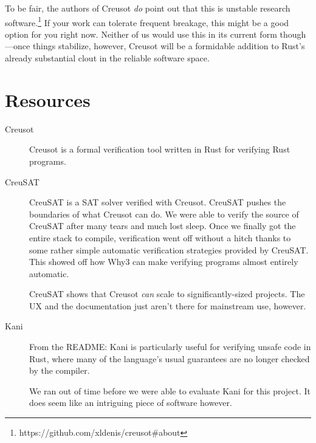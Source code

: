 \documentclass[12pt]{article}
\begin{document}
To be fair, the authors of Creusot \emph{do} point out that this is unstable research software.\footnote{https://github.com/xldenis/creusot#about}
If your work can tolerate frequent breakage, this might be a good option for you right now.
Neither of us would use this in its current form though---once things stabilize, however, Creusot will be a formidable addition to Rust's already substantial clout in the reliable software space.

\section{Resources}

\begin{description}
  \item[Creusot] \cite{denisCreusot2023} \cite{denisCreusotFoundryDeductive2022}

    Creusot is a formal verification tool written in Rust for verifying Rust programs.

  \item[CreuSAT] \cite{skotamCreuSAT2023}

    CreuSAT is a SAT solver verified with Creusot.
    CreuSAT pushes the boundaries of what Creusot can do.
    We were able to verify the source of CreuSAT after many tears and much lost sleep.
    Once we finally got the entire stack to compile, verification went off without a hitch thanks to some rather simple automatic verification strategies provided by CreuSAT.
    This showed off how Why3 can make verifying programs almost entirely automatic.

    CreuSAT shows that Creusot \emph{can} scale to significantly-sized projects.
    The UX and the documentation just aren't there for mainstream use, however.
    
  \item[Kani] \cite{Kani2023}

    From the README: Kani is particularly useful for verifying unsafe code in
    Rust, where many of the language's usual guarantees are no longer checked by
    the compiler.

    We ran out of time before we were able to evaluate Kani for this project.
    It does seem like an intriguing piece of software however.

\end{description}

\printbibliography
\end{document}
